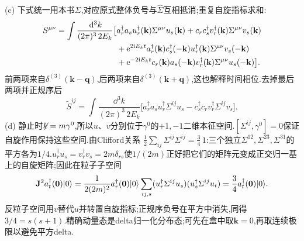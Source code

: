 \begin{solution}
(c) 下式统一用本书$\Sigma$,对应原式整体负号与$\widehat\Sigma$互相抵消;重复自旋指标求和:
\begin{align*}
 S^{\mu\nu}=\int\frac{\dd^3k}{(2\pi)^3\,2E_k}\big[&
 a_r^\dagger a_su_r^\dagger(\mathbf k)\Sigma^{\mu\nu}u_s(\mathbf k)
 +c_rc_s^\dagger v_r^\dagger(\mathbf k)\Sigma^{\mu\nu}v_s(\mathbf k)\\
 &+\e^{2\ii E_kt}a_r^\dagger(\mathbf k)c_s^\dagger(-\mathbf k)
 u_r^\dagger(\mathbf k)\Sigma^{\mu\nu}v_s(-\mathbf k)\\
 &+\e^{-2\ii E_kt}c_r(\mathbf k)a_s(-\mathbf k)
 v_r^\dagger(\mathbf k)\Sigma^{\mu\nu}u_s(-\mathbf k)\big].
\end{align*}
前两项来自$\delta^{(3)}(\mathbf k-\mathbf q)$,后两项来自$\delta^{(3)}(\mathbf k+\mathbf q)$,这也解释时间相位.去掉最后两项并正规序后
\[
 \widetilde S^{ij}=\int\frac{\dd^3k}{(2\pi)^3\,2E_k}
 \big[a_r^\dagger a_su_r^\dagger\Sigma^{ij}u_s
 -c_s^\dagger c_rv_r^\dagger\Sigma^{ij}v_s\big].
\]
(d) 静止时$\slashed k=m\gamma^0$,所以$u$、$v$分别位于$\gamma^0$的$+1,-1$二维本征空间.$[\Sigma^{ij},\gamma^0]=0$保证自旋作用保持这些空间.由Clifford关系
$\frac12\sum_{ij}\Sigma^{ij}\Sigma^{ij}=\frac34\,1$:三个独立$\Sigma^{12},\Sigma^{23},\Sigma^{31}$的平方各为$1/4$.$u_r^\dagger u_s=v_r^\dagger v_s=2m\delta_{rs}$使$1/(2m)$正好把它们的矩阵元变成正交归一基上的自旋矩阵;因此在粒子子空间
\[
 \mathbf J^2 a_t^\dagger(\mathbf0)\ket0
 =\frac1{2(2m)^2}a_r^\dagger(\mathbf0)\ket0
 \sum_{ij,s}(u_r^\dagger\Sigma^{ij}u_s)(u_s^\dagger\Sigma^{ij}u_t)
 =\frac34a_t^\dagger(\mathbf0)\ket0.
\]
反粒子空间用$v$替代$u$并转置自旋指标;正规序负号在平方中消失,同得$3/4=s(s+1)$.精确动量态是delta归一化分布态;可先在盒中取$\mathbf k=0$,再取连续极限以避免平方delta.
\end{solution}
